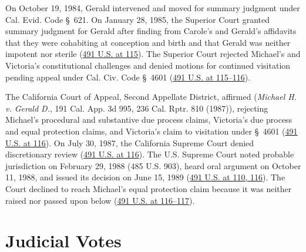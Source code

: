 \documentclass[12pt]{article}
\begin{document}
On October 19, 1984, Gerald intervened and moved for summary judgment under Cal. Evid. Code \S~621. On January 28, 1985, the Superior Court granted summary judgment for Gerald after finding from Carole's and Gerald's affidavits that they were cohabiting at conception and birth and that Gerald was neither impotent nor sterile (\href{https://supreme.justia.com/cases/federal/us/491/110/}{491 U.S. at 115}). The Superior Court rejected Michael's and Victoria's constitutional challenges and denied motions for continued visitation pending appeal under Cal. Civ. Code \S~4601 (\href{https://supreme.justia.com/cases/federal/us/491/110/}{491 U.S. at 115--116}).

The California Court of Appeal, Second Appellate District, affirmed (\textit{Michael H. v. Gerald D.}, 191 Cal. App. 3d 995, 236 Cal. Rptr. 810 (1987)), rejecting Michael's procedural and substantive due process claims, Victoria's due process and equal protection claims, and Victoria's claim to visitation under \S~4601 (\href{https://supreme.justia.com/cases/federal/us/491/110/}{491 U.S. at 116}). On July 30, 1987, the California Supreme Court denied discretionary review (\href{https://supreme.justia.com/cases/federal/us/491/110/}{491 U.S. at 116}). The U.S. Supreme Court noted probable jurisdiction on February 29, 1988 (485 U.S. 903), heard oral argument on October 11, 1988, and issued its decision on June 15, 1989 (\href{https://tile.loc.gov/storage-services/service/ll/usrep/usrep491/usrep491110/usrep491110.pdf}{491 U.S. at 110, 116}). The Court declined to reach Michael's equal protection claim because it was neither raised nor passed upon below (\href{https://supreme.justia.com/cases/federal/us/491/110/}{491 U.S. at 116--117}).

\section{Judicial Votes}
\end{document}
